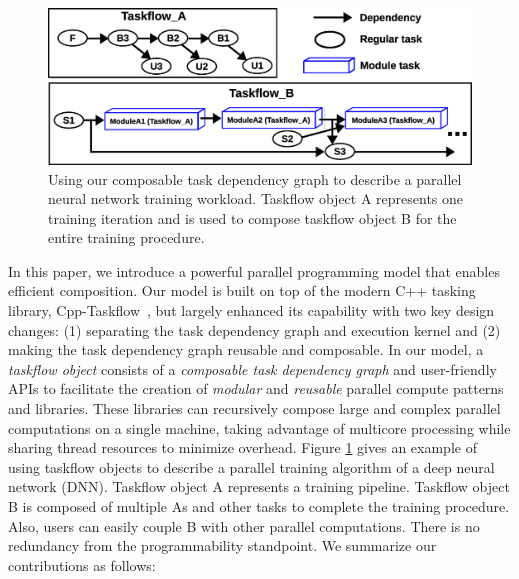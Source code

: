 \documentclass[conference]{IEEEtran}
\begin{document}
\begin{figure}[!h]
  \centering
  \includegraphics[width=.9\columnwidth]{Fig/first_example.eps}
  \caption{
    Using our composable task dependency graph to describe 
    a parallel neural network training workload.
    Taskflow object A represents one training iteration and is used to compose taskflow object B 
    for the entire training procedure.
  }
  \label{fig::taskflow_demo}
\end{figure}

In this paper, we introduce a powerful parallel programming model that enables efficient composition.
Our model is built on top of the modern C++ tasking library, 
Cpp-Taskflow~\cite{Huang_19_01},
but largely enhanced its capability with two key design changes:
(1) separating the task dependency graph and execution kernel
and (2) making the task dependency graph reusable and composable.
In our model, a \emph{taskflow object} consists of a \textit{composable task dependency graph}
and user-friendly APIs to facilitate the creation of \textit{modular} and \textit{reusable}
parallel compute patterns and libraries.
These libraries can recursively compose large and complex parallel computations
on a single machine, taking advantage of multicore processing
while sharing thread resources to minimize overhead.
Figure \ref{fig::taskflow_demo} gives an example of 
using taskflow objects to describe a parallel training algorithm
of a deep neural network (DNN).
Taskflow object A represents a training pipeline.
Taskflow object B is composed of multiple As and other tasks to complete the training procedure.
Also, users can easily couple B with other parallel computations.
There is no redundancy from the programmability standpoint.
We summarize our contributions as follows:
\end{document}
